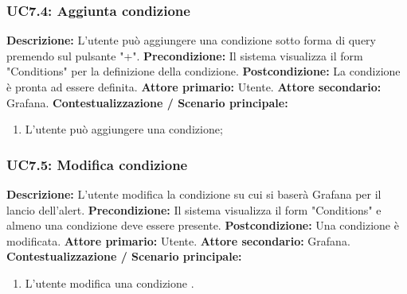                
                \subsubsection{UC7.4: Aggiunta condizione }
                    \textbf{Descrizione:} L’utente può aggiungere una condizione sotto forma di query premendo sul pulsante "+".
                    \newline
                    \textbf{Precondizione:} Il sistema visualizza il form "Conditions" per la definizione della condizione.
                    \newline
                    \textbf{Postcondizione:} La condizione è pronta ad essere definita.
                    \newline
                    \textbf{Attore primario:} Utente.
                    \newline
                    \textbf{Attore secondario:} Grafana.
                    \newline
                    \textbf{Contestualizzazione / Scenario principale:} \begin{enumerate}
                            \item L'utente può aggiungere una condizione;
                        \end{enumerate}   
                      
                \subsubsection{UC7.5: Modifica condizione }
                    \textbf{Descrizione:} L’utente modifica la condizione su cui si baserà Grafana per il lancio dell'alert.
                    \newline
                    \textbf{Precondizione:} Il sistema visualizza il form "Conditions" e almeno una condizione deve essere presente.
                    \newline
                    \textbf{Postcondizione:} Una condizione è modificata.
                    \newline
                    \textbf{Attore primario:} Utente.
                    \newline
                    \textbf{Attore secondario:} Grafana.
                    \newline
                    \textbf{Contestualizzazione / Scenario principale:} \begin{enumerate}
                            \item L'utente modifica una condizione .
                        \end{enumerate}  
                
